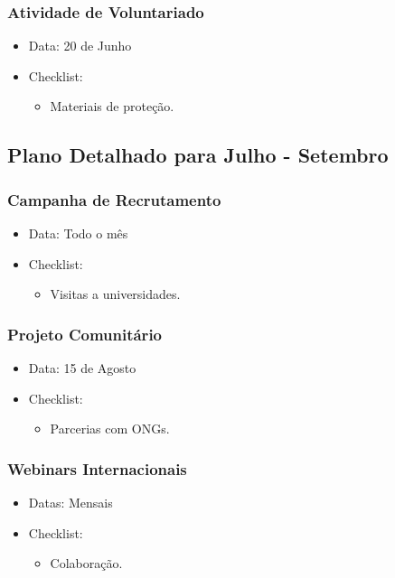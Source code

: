 \documentclass[12pt]{article}
\begin{document}
\subsubsection{Atividade de Voluntariado}
\begin{itemize}
    \item Data: 20 de Junho
    \item Checklist:
      \begin{itemize}
        \item Materiais de proteção.
      \end{itemize}
\end{itemize}

\subsection{Plano Detalhado para Julho - Setembro}

\subsubsection{Campanha de Recrutamento}
\begin{itemize}
    \item Data: Todo o mês
    \item Checklist:
      \begin{itemize}
        \item Visitas a universidades.
      \end{itemize}
\end{itemize}

\subsubsection{Projeto Comunitário}
\begin{itemize}
    \item Data: 15 de Agosto
    \item Checklist:
      \begin{itemize}
        \item Parcerias com ONGs.
      \end{itemize}
\end{itemize}

\subsubsection{Webinars Internacionais}
\begin{itemize}
    \item Datas: Mensais
    \item Checklist:
      \begin{itemize}
        \item Colaboração.
      \end{itemize}
\end{itemize}
\end{document}
